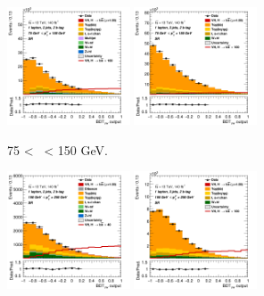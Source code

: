 \begin{figure}[h!]
    \centering
    \begin{subfigure}[b]{\textwidth}
        \centering
        \includegraphics[width=0.40\textwidth]{Images/VH/Own_fit/prefit_VHbb/Region_distmva_BMax150_BMin75_DSR_J2_TTypebb_T2_L1_Y6051_Prefit.png}
        \includegraphics[width=0.40\textwidth]{Images/VH/Own_fit/prefit_VHbb/Region_distmva_BMax150_BMin75_DSR_J3_TTypebb_T2_L1_Y6051_Prefit.png}
        \caption{75 < \ptv\ < 150 GeV.}
        \label{fig:plots_VHbb_1L_75_SR}
    \end{subfigure}
    \begin{subfigure}[b]{\textwidth}
        \centering
        \includegraphics[width=0.40\textwidth]{Images/VH/Own_fit/prefit_VHbb/Region_distmva_BMax250_BMin150_DSR_J2_TTypebb_T2_L1_Y6051_Prefit.png}
        \includegraphics[width=0.40\textwidth]{Images/VH/Own_fit/prefit_VHbb/Region_distmva_BMax250_BMin150_DSR_J3_TTypebb_T2_L1_Y6051_Prefit.png}

\end{subfigure}
\end{figure}
